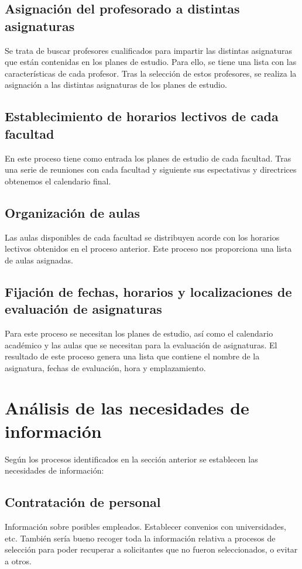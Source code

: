 \documentclass[11pt,a4paper,spanish,twoside]{book}
\begin{document}
\subsection{Asignación del profesorado a distintas asignaturas}
Se trata de buscar profesores cualificados para impartir las distintas
asignaturas que están contenidas en los planes de estudio. Para ello, se
tiene una lista con las características de cada profesor. Tras la selección
de estos profesores, se realiza la asignación a las distintas asignaturas de
los planes de estudio.
 
\subsection{Establecimiento de horarios lectivos de cada facultad}
En este proceso tiene como entrada los planes de estudio de cada
facultad. Tras una serie de reuniones con cada facultad y siguiente sus
espectativas y directrices obtenemos el calendario final.

\subsection{Organización de aulas}
Las aulas disponibles de cada facultad se distribuyen acorde con los horarios
lectivos obtenidos en el proceso anterior. Este proceso nos proporciona una
lista de aulas asignadas. 

\subsection{Fijación de fechas, horarios y localizaciones de evaluación de
  asignaturas}
Para este proceso se necesitan los planes de estudio, así como el calendario
académico y las aulas que se necesitan para la evaluación de asignaturas. El
resultado de este proceso genera una lista que contiene el nombre de la
asignatura, fechas de evaluación, hora y emplazamiento. 

\section{Análisis de las necesidades de información}
Según los procesos identificados en la sección anterior se establecen las
necesidades de información: 

\subsection{Contratación de personal}
     Información sobre posibles empleados. Establecer convenios con universidades,
etc. También sería bueno recoger toda la información relativa a procesos de selección
para poder recuperar a solicitantes que no fueron seleccionados, o evitar a otros.
\end{document}
